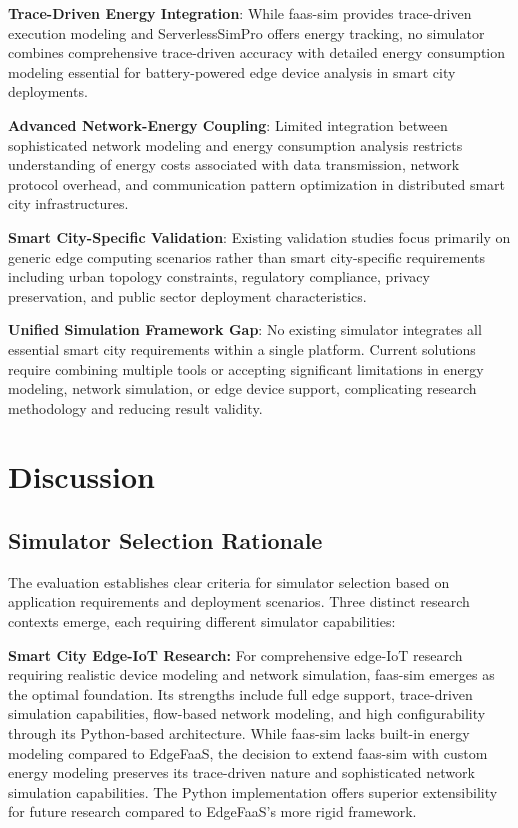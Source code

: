 \textbf{Trace-Driven Energy Integration}: While faas-sim provides trace-driven execution modeling and ServerlessSimPro offers energy tracking, no simulator combines comprehensive trace-driven accuracy with detailed energy consumption modeling essential for battery-powered edge device analysis in smart city deployments.

\textbf{Advanced Network-Energy Coupling}: Limited integration between sophisticated network modeling and energy consumption analysis restricts understanding of energy costs associated with data transmission, network protocol overhead, and communication pattern optimization in distributed smart city infrastructures.

\textbf{Smart City-Specific Validation}: Existing validation studies focus primarily on generic edge computing scenarios rather than smart city-specific requirements including urban topology constraints, regulatory compliance, privacy preservation, and public sector deployment characteristics.

\textbf{Unified Simulation Framework Gap}: No existing simulator integrates all essential smart city requirements within a single platform. Current solutions require combining multiple tools or accepting significant limitations in energy modeling, network simulation, or edge device support, complicating research methodology and reducing result validity.

\section{Discussion}

\subsection{Simulator Selection Rationale}

The evaluation establishes clear criteria for simulator selection based on application requirements and deployment scenarios. Three distinct research contexts emerge, each requiring different simulator capabilities:

\textbf{Smart City Edge-IoT Research:} For comprehensive edge-IoT research requiring realistic device modeling and network simulation, faas-sim emerges as the optimal foundation. Its strengths include full edge support, trace-driven simulation capabilities, flow-based network modeling, and high configurability through its Python-based architecture. While faas-sim lacks built-in energy modeling compared to EdgeFaaS, the decision to extend faas-sim with custom energy modeling preserves its trace-driven nature and sophisticated network simulation capabilities. The Python implementation offers superior extensibility for future research compared to EdgeFaaS's more rigid framework.

